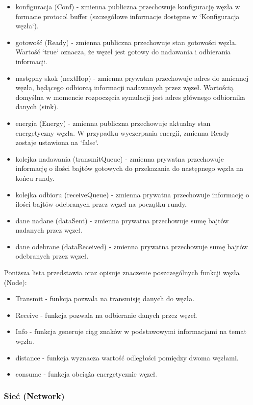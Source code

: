 \documentclass[a4paper,12pt,twoside,openany]{report}
\begin{document}
\begin{itemize}
 \item konfiguracja (Conf) - zmienna publiczna przechowuje konfigurację węzła w formacie protocol buffer (szczegółowe informacje dostępne w `Konfiguracja węzła`).
 \item gotowość (Ready) - zmienna publiczna przechowuje stan gotowości węzła. Wartość `true` oznacza, że węzeł jest gotowy do nadawania i odbierania informacji.
 \item następny skok (nextHop) - zmienna prywatna przechowuje adres do zmiennej węzła, będącego odbiorcą informacji nadawanych przez węzeł. Wartością domyślna w momencie
       rozpoczęcia symulacji jest adres głównego odbiornika danych (sink).
 \item energia (Energy) - zmienna publiczna przechowuje aktualny stan energetyczny węzła. W przypadku wyczerpania energii, zmienna Ready zostaje ustawiona na `false`.
 \item kolejka nadawania (transmitQueue) - zmienna prywatna przechowuje informację o ilości bajtów gotowych do przekazania do następnego węzła na końcu rundy.
 \item kolejka odbioru (receiveQueue) - zmienna prywatna przechowuje informację o ilości bajtów odebranych przez węzeł na początku rundy.
 \item dane nadane (dataSent) - zmienna prywatna przechowuje sumę bajtów nadanych przez węzeł.
 \item dane odebrane (dataReceived) - zmienna prywatna przechowuje sumę bajtów odebranych przez węzeł.
\end{itemize}

Poniższa lista przedstawia oraz opisuje znaczenie poszczególnych funkcji węzła (Node):

\begin{itemize}
 \item Transmit - funkcja pozwala na transmisję danych do węzła.
 \item Receive - funkcja pozwala na odbieranie danych przez węzeł.
 \item Info - funkcja generuje ciąg znaków w podstawowymi informacjami na temat węzła.
 \item distance - funkcja wyznacza wartość odległości pomiędzy dwoma węzłami.
 \item consume - funkcja obciąża energetycznie węzeł.
\end{itemize}

\subsubsection{Sieć (Network)}
\end{document}
